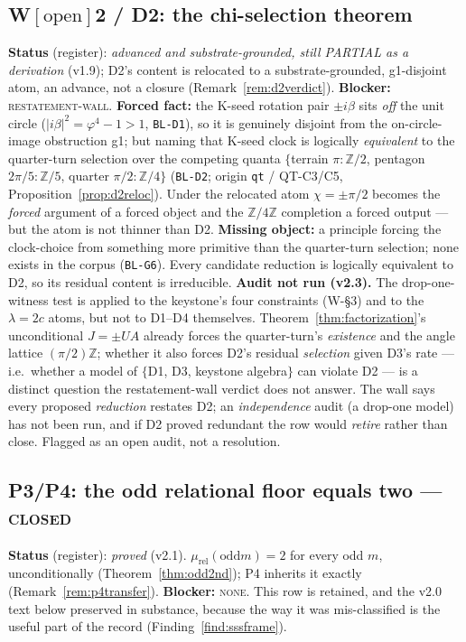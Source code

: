\documentclass[11pt]{article}
\newcommand{\hx}[1]{\textcolor{cC}{\footnotesize\texttt{#1}}}
\newcommand{\Z}{\mathbb{Z}}
\newcommand{\gp}{\varphi}
\theoremstyle{plain}
\theoremstyle{definition}
\theoremstyle{remark}
\begin{document}
\subsection{W\texorpdfstring{$[\text{open}]$}{[open]}2 / D2: the chi-selection theorem}\label{blk:d2}
\textbf{Status} (register): \emph{advanced and substrate-grounded, still
PARTIAL as a derivation} (v1.9); D2's content is relocated to a
substrate-grounded, g1-disjoint atom, an advance, not a closure
(Remark~\ref{rem:d2verdict}). \textbf{Blocker:} \textsc{restatement-wall}.
\textbf{Forced fact:} the K-seed rotation pair $\pm i\beta$ sits \emph{off} the
unit circle ($|i\beta|^2=\gp^4-1>1$, \hx{BL-D1}), so it is genuinely disjoint
from the on-circle-image obstruction g1; but naming that K-seed clock is
logically \emph{equivalent} to the quarter-turn selection over the competing
quanta $\{$terrain $\pi:\Z/2$, pentagon $2\pi/5:\Z/5$, quarter $\pi/2:\Z/4\}$
(\hx{BL-D2}; origin \texttt{qt} / QT-C3/C5, Proposition~\ref{prop:d2reloc}).
Under the relocated atom $\chi=\pm\pi/2$ becomes the \emph{forced} argument of a
forced object and the $\Z/4\Z$ completion a forced output --- but the atom is not
thinner than D2. \textbf{Missing object:} a principle forcing the clock-choice
from something more primitive than the quarter-turn selection; none exists in the
corpus (\hx{BL-G6}). Every candidate reduction is logically equivalent to D2, so
its residual content is irreducible.
\textbf{Audit not run (v2.3).} The drop-one-witness test is applied to the
keystone's four constraints (W-\S3) and to the $\lambda=2c$ atoms, but not to
D1--D4 themselves. Theorem~\ref{thm:factorization}'s unconditional $J=\pm UA$
already forces the quarter-turn's \emph{existence} and the angle lattice
$(\pi/2)\Z$; whether it also forces D2's residual \emph{selection} given D3's rate
--- i.e.\ whether a model of $\{$D1, D3, keystone algebra$\}$ can violate D2 ---
is a distinct question the restatement-wall verdict does not answer. The wall says
every proposed \emph{reduction} restates D2; an \emph{independence} audit (a
drop-one model) has not been run, and if D2 proved redundant the row would
\emph{retire} rather than close. Flagged as an open audit, not a resolution.

\subsection{P3/P4: the odd relational floor equals two --- \textsc{closed}}\label{blk:odd2}
\textbf{Status} (register): \emph{proved} (v2.1). $\mu_{\mathrm{rel}}(\text{odd
}m)=2$ for every odd $m$, unconditionally (Theorem~\ref{thm:odd2nd}); P4
inherits it exactly (Remark~\ref{rem:p4transfer}). \textbf{Blocker:}
\textsc{none}. This row is retained, and the v2.0 text below preserved in
substance, because the way it was mis-classified is the useful part of the
record (Finding~\ref{find:sssframe}).
\end{document}
